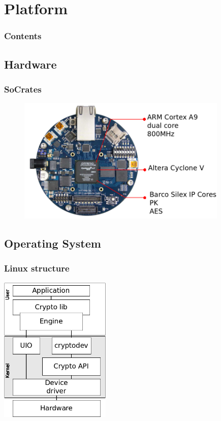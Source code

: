 \documentclass[xcolor={x11names, rgb, usenames, dvipsnames}]{beamer}
\begin{document}
\section{Platform}
\begin{frame}
\frametitle{Contents}
\tableofcontents[%
	currentsection,
	sectionstyle=show/shaded,%
	subsectionstyle=show/show/hide,%
	]
\end{frame}


\subsection{Hardware}
\begin{frame}
\frametitle{SoCrates}
	\begin{figure}
	\includegraphics[height=6cm]{socrates-annotated.png}
	\end{figure}
\end{frame}


\subsection{Operating System}
\begin{frame}
\frametitle{Linux structure}
	\begin{center}
	\includegraphics[height=7cm]{os-path-generic.png}
	\end{center}
\end{frame}
\end{document}
